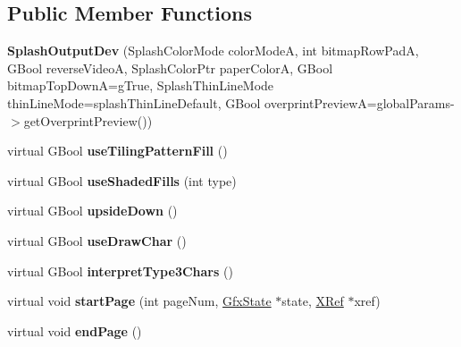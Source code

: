 \subsection*{Public Member Functions}
\begin{DoxyCompactItemize}
\item 
\mbox{\label{class_splash_output_dev_a573ef4d16f6f6f9e58aee16bebd03b91}} 
{\bfseries Splash\+Output\+Dev} (Splash\+Color\+Mode color\+ModeA, int bitmap\+Row\+PadA, G\+Bool reverse\+VideoA, Splash\+Color\+Ptr paper\+ColorA, G\+Bool bitmap\+Top\+DownA=g\+True, Splash\+Thin\+Line\+Mode thin\+Line\+Mode=splash\+Thin\+Line\+Default, G\+Bool overprint\+PreviewA=global\+Params-\/$>$get\+Overprint\+Preview())
\item 
\mbox{\label{class_splash_output_dev_a2f17cd900b94377281927cad046305a4}} 
virtual G\+Bool {\bfseries use\+Tiling\+Pattern\+Fill} ()
\item 
\mbox{\label{class_splash_output_dev_a0006831ac5e4f1c9c2edfa5a2bc3f05f}} 
virtual G\+Bool {\bfseries use\+Shaded\+Fills} (int type)
\item 
\mbox{\label{class_splash_output_dev_a12ccc54c04f37930e7d10500eb3bd7cd}} 
virtual G\+Bool {\bfseries upside\+Down} ()
\item 
\mbox{\label{class_splash_output_dev_a5bbe45ef25cf9b6e3357c0ffbfb8c98a}} 
virtual G\+Bool {\bfseries use\+Draw\+Char} ()
\item 
\mbox{\label{class_splash_output_dev_a29024ecc13db2e418e2fbaaf1ca9dc39}} 
virtual G\+Bool {\bfseries interpret\+Type3\+Chars} ()
\item 
\mbox{\label{class_splash_output_dev_a802c51e8d7ce384322d51bbe5d6ffb00}} 
virtual void {\bfseries start\+Page} (int page\+Num, \hyperlink{class_gfx_state}{Gfx\+State} $\ast$state, \hyperlink{class_x_ref}{X\+Ref} $\ast$xref)
\item 
\mbox{\label{class_splash_output_dev_aac108f9462b713ef0ef0352c20100afb}} 
virtual void {\bfseries end\+Page} ()
\item 

\end{DoxyCompactItemize}
